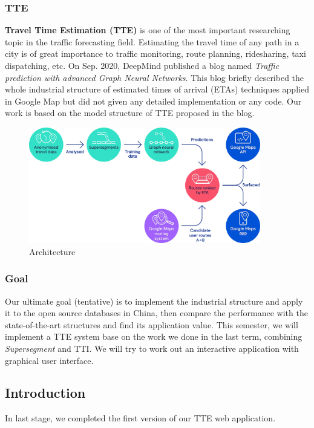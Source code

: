 \documentclass[fontset=none]{ctexart}
\theoremstyle{definition}
\theoremstyle{remark}
\begin{document}
\subsubsection{TTE}
\textbf{Travel Time Estimation (TTE)} is one of the most important researching topic in the traffic forecasting field. 
Estimating the travel time of any path in a city is of great importance to traffic monitoring, route planning, ridesharing, taxi dispatching, etc.
On Sep. 2020, DeepMind published a blog named \textit{Traffic prediction with advanced Graph Neural Networks}. 
This blog briefly described the whole industrial structure of estimated times of arrival (ETAs) techniques applied in Google Map but did not given any detailed implementation or any code.
Our work is based on the model structure of TTE proposed in the blog.
\begin{figure}[htb]
    \centering
    \includegraphics[width=0.9\textwidth]{images/architecture.png}
    \caption{Architecture}
    \label{fig1}
\end{figure}

\subsubsection{Goal}
Our ultimate goal (tentative) is to implement the industrial structure and apply it to the open source databases in China, then compare the performance with the state-of-the-art structures and find its application value.
This semester, we will implement a TTE system base on the work we done in the last term, combining \textit{Supersegment} and TTI.
We will try to work out an interactive application with graphical user interface. 

\subsection{Introduction}
In last stage, we completed the first version of our TTE web application.
\end{document}
